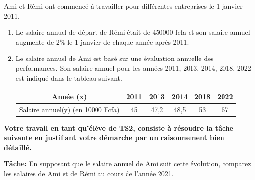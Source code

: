 \begin{exercice}


Ami et Rémi   ont commencé à travailler pour différentes entreprises le  1  janvier 2011.

\begin{enumerate}
\item[$  \bullet$]  Le salaire annuel de départ de  Rémi  était de $ 450000 $ fcfa
 et son salaire annuel augmente de 2\% le   1  janvier de chaque année après  2011.
\medskip


\item[$  \bullet$] Le salaire  annuel de  Ami  est basé sur une évaluation annuelle des performances. Son salaire  annuel pour les années 2011, 2013, 2014, 2018, 2022 est indiqué dans le tableau suivant.
 \begin{center}
 \renewcommand{\arraystretch}{1.2}
 \setlength{\arrayrulewidth}{1.2pt}
 \begin{tabular}{|c|c|c|c|c|c|}
 \hline
 Année (x) &2011&2013&2014&2018&2022\\ \hline
 Salaire annuel(y) (en 10000 Fcfa) & 45& 47,2&48,5&53&57\\\hline
 
 \end{tabular} 
 \end{center}
\end{enumerate}

\textbf{ Votre travail en tant qu'élève de TS2, consiste à résoudre la tâche suivante en justifiant votre démarche par un raisonnement bien détaillé.}

\medskip

\textbf{Tâche:}
 En supposant que le salaire annuel de Ami suit cette évolution, comparez les salaires 
de Ami et  de Rémi au cours de l’année 2021.
   
\end{exercice}

